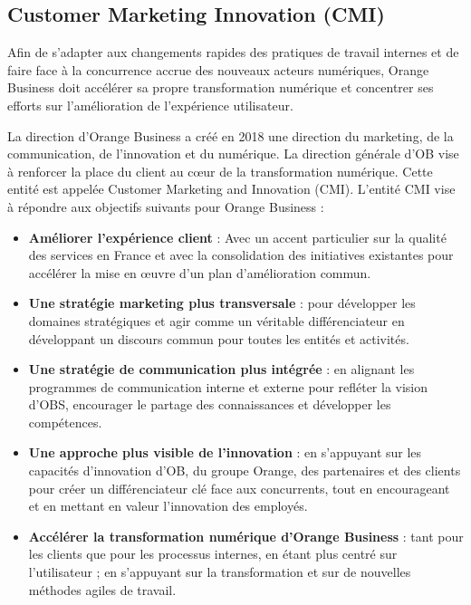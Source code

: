 \subsection{Customer Marketing Innovation (CMI)}
Afin de s’adapter aux changements rapides des pratiques de travail internes et de faire face à
la concurrence accrue des nouveaux acteurs numériques, Orange Business doit accélérer sa propre transformation numérique et concentrer ses efforts sur l’amélioration de l’expérience utilisateur.

\medskip

La direction d’Orange Business a créé en 2018 une direction du marketing, de la communication, de l’innovation et du numérique. 
La direction générale d’OB vise à renforcer la place du client au cœur de la transformation numérique. 
Cette entité est appelée Customer Marketing and Innovation (CMI). 
L’entité CMI vise à répondre aux objectifs suivants pour Orange Business :

\begin{itemize}
    \item \textbf{Améliorer l’expérience client} : Avec un accent particulier sur la qualité des services en France et
    avec la consolidation des initiatives existantes pour accélérer la mise en œuvre d’un plan d’amélioration
    commun.
    \item \textbf{Une stratégie marketing plus transversale} : pour développer les domaines stratégiques et agir
    comme un véritable différenciateur en développant un discours commun pour toutes les entités et activités.
    \item \textbf{Une stratégie de communication plus intégrée} : en alignant les programmes de communication
    interne et externe pour refléter la vision d’OBS, encourager le partage des connaissances et développer
    les compétences.
    \item \textbf{Une approche plus visible de l’innovation} : en s’appuyant sur les capacités d’innovation d’OB, du
    groupe Orange, des partenaires et des clients pour créer un différenciateur clé face aux concurrents,
    tout en encourageant et en mettant en valeur l’innovation des employés.
    \item \textbf{Accélérer la transformation numérique d’Orange Business} : tant pour les clients que pour les processus internes, 
    en étant plus centré sur l’utilisateur ; en s’appuyant sur la transformation et sur de nouvelles méthodes agiles de travail.
\end{itemize}

